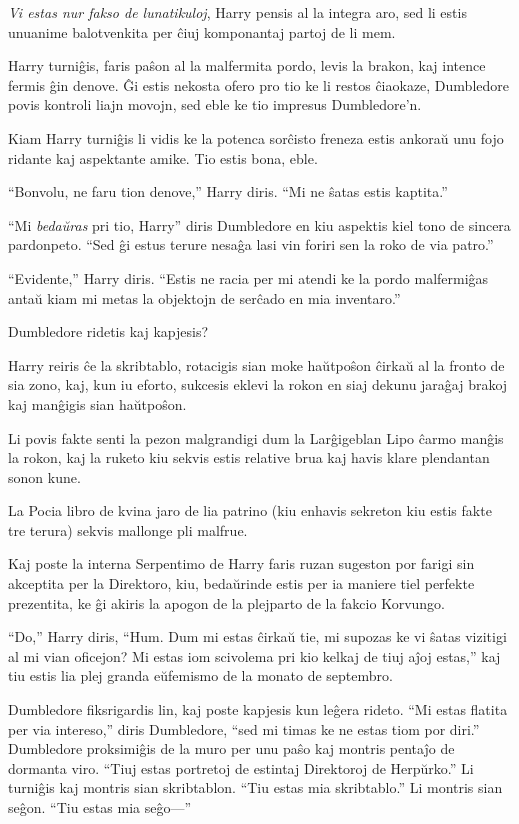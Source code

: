 \emph{Vi estas nur fakso de lunatikuloj}, Harry pensis al la integra
aro, sed li estis unuanime balotvenkita per ĉiuj komponantaj partoj de
li mem.

Harry turniĝis, faris paŝon al la malfermita pordo, levis la brakon,
kaj intence fermis ĝin denove. Ĝi estis nekosta ofero pro tio ke li
restos ĉiaokaze, Dumbledore povis kontroli liajn movojn, sed eble ke
tio impresus Dumbledore'n.

Kiam Harry turniĝis li vidis ke la potenca sorĉisto freneza estis
ankoraŭ unu fojo ridante kaj aspektante amike. Tio estis bona, eble.

``Bonvolu, ne faru tion denove,'' Harry diris. ``Mi ne ŝatas estis kaptita.''

``Mi \emph{bedaŭras} pri tio, Harry'' diris Dumbledore en kiu aspektis
kiel tono de sincera pardonpeto. ``Sed ĝi estus terure nesaĝa lasi vin
foriri sen la roko de via patro.''

``Evidente,'' Harry diris. ``Estis ne racia per mi atendi ke la pordo
malfermiĝas antaŭ kiam mi metas la objektojn de serĉado en mia
inventaro.''

Dumbledore ridetis kaj kapjesis?

Harry reiris ĉe la skribtablo, rotacigis sian moke haŭtpoŝon ĉirkaŭ al
la fronto de sia zono, kaj, kun iu eforto, sukcesis eklevi la rokon en
siaj dekunu jaraĝaj brakoj kaj manĝigis sian haŭtpoŝon.

Li povis fakte senti la pezon malgrandigi dum la Larĝigeblan Lipo
ĉarmo manĝis la rokon, kaj la ruketo kiu sekvis estis relative brua
kaj havis klare plendantan sonon kune. 

La Pocia libro de kvina jaro de lia patrino (kiu enhavis sekreton kiu
estis fakte tre terura) sekvis mallonge pli malfrue.

Kaj poste la interna Serpentimo de Harry faris ruzan sugeston por
farigi sin akceptita per la Direktoro, kiu, bedaŭrinde estis per ia
maniere tiel perfekte prezentita, ke ĝi akiris la apogon de la
plejparto de la fakcio Korvungo.

``Do,'' Harry diris, ``Hum. Dum mi estas ĉirkaŭ tie, mi supozas ke vi
ŝatas vizitigi al mi vian oficejon? Mi estas iom scivolema pri kio
kelkaj de tiuj aĵoj estas,'' kaj tiu estis lia plej granda eŭfemismo
de la monato de septembro.

Dumbledore fiksrigardis lin, kaj poste kapjesis kun leĝera
rideto. ``Mi estas flatita per via intereso,'' diris Dumbledore, ``sed
mi timas ke ne estas tiom por diri.'' Dumbledore proksimiĝis de la
muro per unu paŝo kaj montris pentaĵo de dormanta viro. ``Tiuj estas
portretoj de estintaj Direktoroj de Herpŭrko.'' Li turniĝis kaj
montris sian skribtablon. ``Tiu estas mia skribtablo.'' Li montris
sian seĝon. ``Tiu estas mia seĝo—''

